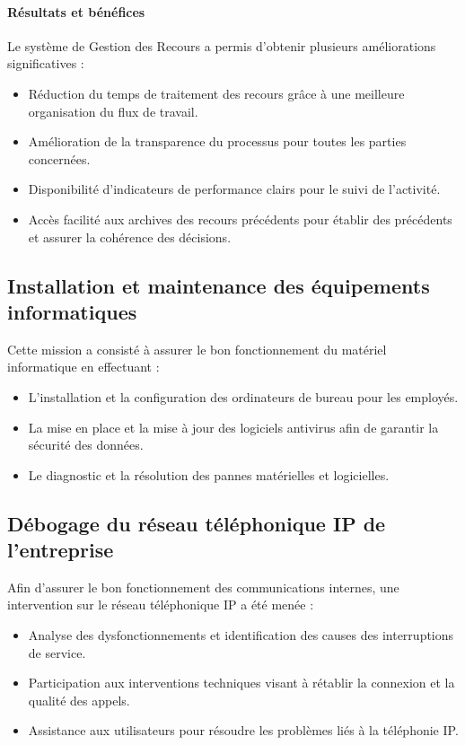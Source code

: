 \paragraph{Résultats et bénéfices}
Le système de Gestion des Recours a permis d'obtenir plusieurs améliorations significatives :
\begin{itemize}
    \item Réduction du temps de traitement des recours grâce à une meilleure organisation du flux de travail.
    \item Amélioration de la transparence du processus pour toutes les parties concernées.
    \item Disponibilité d'indicateurs de performance clairs pour le suivi de l'activité.
    \item Accès facilité aux archives des recours précédents pour établir des précédents et assurer la cohérence des décisions.
\end{itemize}

\subsection{Installation et maintenance des équipements informatiques}
Cette mission a consisté à assurer le bon fonctionnement du matériel informatique en effectuant :
\begin{itemize}
    \item L'installation et la configuration des ordinateurs de bureau pour les employés.
    \item La mise en place et la mise à jour des logiciels antivirus afin de garantir la sécurité des données.
    \item Le diagnostic et la résolution des pannes matérielles et logicielles.
\end{itemize}

\subsection{Débogage du réseau téléphonique IP de l'entreprise}
Afin d'assurer le bon fonctionnement des communications internes, une intervention sur le réseau téléphonique IP a été menée :
\begin{itemize}
    \item Analyse des dysfonctionnements et identification des causes des interruptions de service.
    \item Participation aux interventions techniques visant à rétablir la connexion et la qualité des appels.
    \item Assistance aux utilisateurs pour résoudre les problèmes liés à la téléphonie IP.
\end{itemize}

